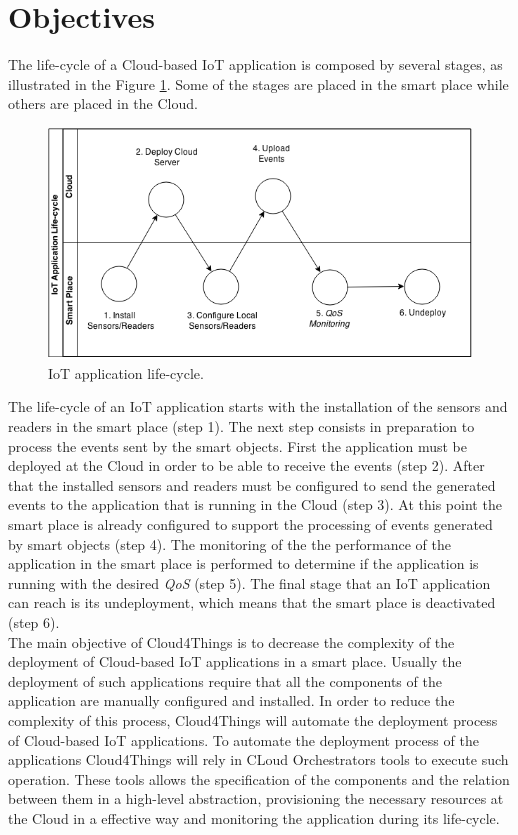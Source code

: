 \section{Objectives}
\label{sec:objectives}
The life-cycle of a Cloud-based IoT application is composed by several stages,
as illustrated in the Figure \ref{fig:life-cycle}. Some of the stages are placed in
the smart place while others are placed in the Cloud.
\begin{figure}[h!]
  \centering
  \includegraphics[width=\textwidth]{./images/life-cycle}
  \caption{IoT application life-cycle.}
  \label{fig:life-cycle}
\end{figure}

The life-cycle of an IoT application starts with the installation of the sensors and
readers in the smart place (step 1). The next step consists in preparation to
process the events sent by the smart objects. First the application must be deployed at
the Cloud in order to be able to receive the events (step 2). After that the installed
sensors and readers must be configured to send the generated events to the application that is
running in the Cloud (step 3). At this point the smart place is already configured to
support the processing of events generated by smart objects (step 4). The monitoring of the
the performance of the application in the smart place is performed to determine if the
application is running  with the desired \textit{QoS} (step 5). The final stage that an IoT
application can reach is its undeployment, which means that the smart place is deactivated (step 6).\\

The main objective of Cloud4Things is to decrease the complexity of the deployment of Cloud-based
IoT applications in a smart place. Usually the deployment of such applications require that
all the components of the application are manually configured and installed. In order
to reduce the complexity of this process, Cloud4Things will automate the deployment process
of Cloud-based IoT applications. To automate the deployment process of the applications
Cloud4Things will rely in CLoud Orchestrators tools to execute such operation. These
tools allows the specification of the components and the relation between them in a
high-level abstraction, provisioning the necessary resources at the Cloud in a effective
way and monitoring the application during its life-cycle.\\

